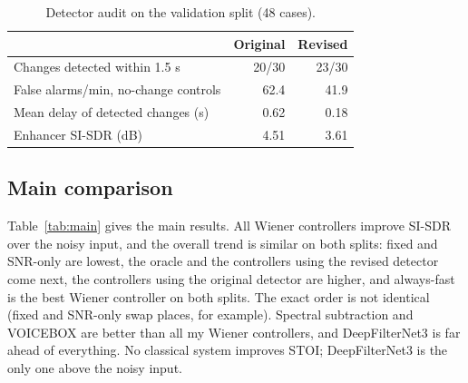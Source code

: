 \documentclass[10pt,conference,a4paper]{IEEEtran}
\begin{document}
\begin{table}[t]
\centering
\caption{Detector audit on the validation split (48 cases).}
\label{tab:detector}
\footnotesize
\begin{tabular}{@{}lrr@{}}
\toprule
& Original & Revised\\
\midrule
Changes detected within 1.5 s & 20/30 & 23/30\\
False alarms/min, no-change controls & 62.4 & 41.9\\
Mean delay of detected changes (s) & 0.62 & 0.18\\
Enhancer SI-SDR (dB) & 4.51 & 3.61\\
\bottomrule
\end{tabular}
\end{table}

\subsection{Main comparison}
Table~\ref{tab:main} gives the main results. All Wiener controllers improve
SI-SDR over the noisy input, and the overall trend is similar on both splits:
fixed and SNR-only are lowest, the oracle and the controllers using the revised
detector come next, the controllers using the original detector are higher, and
always-fast is the best Wiener controller on both splits. The exact order is not
identical (fixed and SNR-only swap places, for example). Spectral subtraction and VOICEBOX are better than all my Wiener
controllers, and DeepFilterNet3 is far ahead of everything. No classical system
improves STOI; DeepFilterNet3 is the only one above the noisy input.
\end{document}
